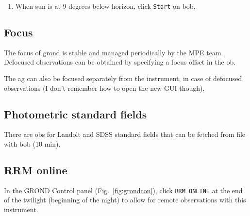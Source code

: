 \documentclass[11pt,fleqn]{book} %
\begin{document}
\begin{enumerate}
  \item When sun is at 9 degrees below horizon, click \texttt{Start} on \gls{bob}.
\end{enumerate}

\subsection{Focus}

The focus of \gls{grond} is stable and managed periodically by the MPE team.  Defocused observations can be obtained by specifying a focus offset in the \gls{ob}.

The \gls{ag} can also be focused separately from the instrument, in case of defocused observations (I don't remember how to open the new GUI though).


\subsection{Photometric standard fields}

There are \glspl{ob} for Landolt and SDSS standard fields that can be fetched from file with \gls{bob} (10 min).

\subsection{RRM online}
In the GROND Control panel (Fig.~\ref{fig:grondcon}), click \texttt{RRM ONLINE} at the end of the twilight (beginning of the night) to allow for remote observations with this instrument.









\end{document}
